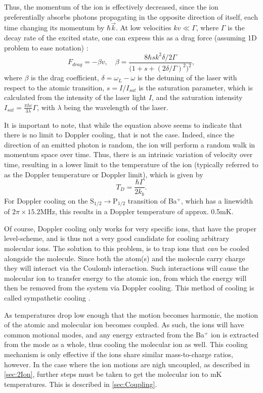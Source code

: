 Thus, the momentum of the ion is effectively decreased, since the ion preferentially absorbs photons propagating in the opposite direction of itself, each time changing its momentum by $\hbar\vec{k}$. At low velocities $kv\ll\Gamma$, where $\Gamma$ is the decay rate of the excited state, one can express this as a drag force (assuming 1D problem to ease notation) \cite{Fisher_2017}:
\begin{equation}
    F_{drag} = -\beta v,\quad \beta = \frac{8\hbar s k^2\delta / 2\Gamma}{\big(1+s+(2\delta/\Gamma)^2\big)^2},
\end{equation}
where $\beta$ is the drag coefficient, $\delta = \omega_L-\omega$ is the detuning of the laser with respect to the atomic transition, $s = I/I_{sat}$ is the saturation parameter, which is calculated from the intensity of the laser light $I$, and the saturation intensity $I_{sat} = \frac{\pi hc}{3\lambda}\Gamma$, with $\lambda$ being the wavelength of the laser. 

It is important to note, that while the equation above seems to indicate that there is no limit to Doppler cooling, that is not the case. Indeed, since the direction of an emitted photon is random, the ion will perform a random walk in momentum space over time.
Thus, there is an intrinsic variation of velocity over time, resulting in a lower limit to the temperature of the ion (typically referred to as the Doppler temperature or Doppler limit), which is given by
\begin{equation}
    T_D = \frac{\hbar\Gamma}{2k_b}\label{eq:DopplerTemp}.
\end{equation}
For Doppler cooling on the $\text{S}_{1/2} \rightarrow \text{P}_{1/2}$ transition of Ba$^+$, which has a linewidth of $2\pi\times 15.2$MHz, this results in a Doppler temperature of approx. 0.5mK.

Of course, Doppler cooling only works for very specific ions, that have the proper level-scheme, and is thus not a very good candidate for cooling arbitrary molecular ions.
The solution to this problem, is to trap ions that \textit{can} be cooled alongside the molecule. Since both the atom(s) and the molecule carry charge they will interact via the Coulomb interaction. Such interactions will cause the molecular ion to transfer energy to the atomic ion, from which the energy will then be removed from the system via Doppler cooling. This method of cooling is called sympathetic cooling \cite{StefanSympa,MichaelSympa}.

As temperatures drop low enough that the motion becomes harmonic, the motion of the atomic and molecular ion becomes coupled. As such, the ions will have common motional modes, and any energy extracted from the Ba$^+$ ion is extracted from the mode as a whole, thus cooling the molecular ion as well.
This cooling mechanism is only effective if the ions share similar mass-to-charge ratios, however. In the case where the ion motions are nigh uncoupled, as described in \cref{sec:2Ion}, further steps must be taken to get the molecular ion to mK temperatures. This is described in \cref{sec:Coupling}.


